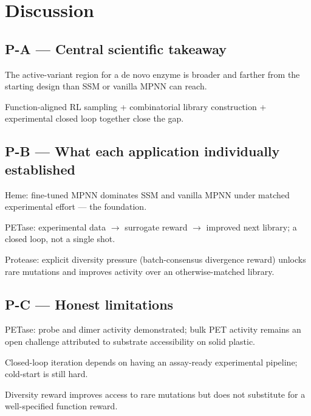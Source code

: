 \section{Discussion}
\label{sec:discussion}


\subsection*{P-A --- Central scientific takeaway}
\begin{planlist}
  \item The active-variant region for a de novo enzyme is broader and farther
        from the starting design than SSM or vanilla MPNN can reach.
  \item Function-aligned RL sampling + combinatorial library construction +
        experimental closed loop together close the gap.
\end{planlist}

\subsection*{P-B --- What each application individually established}
\begin{planlist}
  \item Heme: fine-tuned MPNN dominates SSM and vanilla MPNN under matched
        experimental effort --- the foundation.
  \item PETase: experimental data $\rightarrow$ surrogate reward $\rightarrow$
        improved next library; a closed loop, not a single shot.
  \item Protease: explicit diversity pressure (batch-consensus divergence
        reward) unlocks rare mutations and improves activity over an
        otherwise-matched library.
\end{planlist}

\subsection*{P-C --- Honest limitations}
\begin{planlist}
  \item PETase: probe and dimer activity demonstrated; bulk PET activity
        remains an open challenge attributed to substrate accessibility on
        solid plastic.
  \item Closed-loop iteration depends on having an assay-ready experimental
        pipeline; cold-start is still hard.
  \item Diversity reward improves access to rare mutations but does not
        substitute for a well-specified function reward.
\end{planlist}

